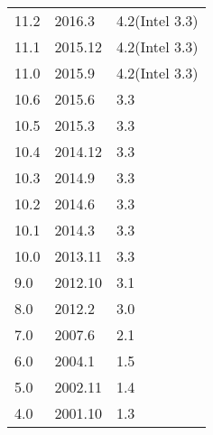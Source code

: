 \begin{center}  
\tablelasttail{\bottomrule}

\begin{supertabular}{p{2.cm}p{2.cm}m{11.cm}}
      11.2 & 2016.3 & 4.2(Intel 3.3)\\
      11.1 & 2015.12 & 4.2(Intel 3.3)\\
      11.0 & 2015.9 & 4.2(Intel 3.3)\\
      10.6 & 2015.6 & 3.3\\
      10.5 & 2015.3 & 3.3\\
      10.4 & 2014.12 & 3.3\\
      10.3 & 2014.9 & 3.3\\
      10.2 & 2014.6 & 3.3\\
      10.1 & 2014.3 & 3.3\\
      10.0 & 2013.11 & 3.3\\
      9.0 & 2012.10 & 3.1\\
      8.0 & 2012.2 & 3.0\\
      7.0 & 2007.6 & 2.1\\
      6.0 & 2004.1 & 1.5\\
      5.0 & 2002.11 & 1.4\\
      4.0 & 2001.10 & 1.3\\
\end{supertabular}
\end{center}





